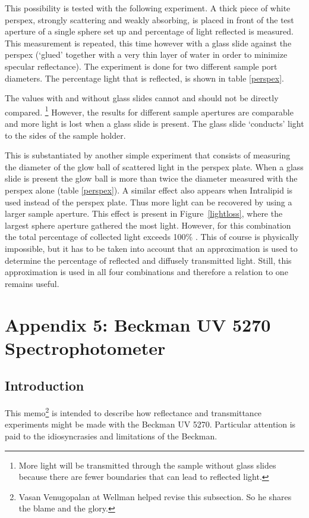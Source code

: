 \documentclass{article}
\begin{document}
This possibility is tested with the following experiment.  A thick piece of
white perspex, strongly scattering and weakly absorbing, is placed in front of
the test aperture of a single sphere set up and percentage of light reflected
is measured.  This measurement is repeated, this time however with a glass
slide against the perspex (`glued' together with a very thin layer of water in
order to minimize  specular reflectance).  The experiment is done for two
different sample port diameters.  The percentage
light that is reflected, is shown in table \ref{perspex}.

The values with and without glass slides cannot and should not be directly compared.%
\footnote{More light will be transmitted through the sample without glass
slides because there are fewer boundaries that can lead to reflected light.}
However, the results for different sample apertures are comparable and
more light is lost when a glass slide is present.  The  glass slide `conducts'
light to the sides of the sample holder.  

This is substantiated by another simple experiment that consists of measuring
the diameter of the glow ball of scattered light in the perspex plate.  When a
glass slide is present the glow ball is more than twice the diameter measured
with the perspex alone (table \ref{perspex}).  A similar effect
also appears when Intralipid is used instead of the perspex plate.  Thus more
light can be recovered by using a larger sample aperture.  This effect is
present in Figure~\ref{lightloss}, where the largest sphere aperture gathered
the most light. However, for this combination the total percentage of collected
light exceeds 100\% .  This of course is physically
impossible, but it has to be taken into account that an approximation is used
to determine the percentage of reflected and diffusely transmitted light. 
Still, this approximation is used in all four combinations and therefore a
relation to one remains useful.


\clearpage
\section*{Appendix 5: Beckman UV 5270 Spectrophotometer}

\subsection*{Introduction}
This memo\footnote{Vasan Venugopalan
at Wellman helped revise this subsection.  So he shares the blame and the glory.}
 is intended to describe how reflectance and transmittance experiments might be 
made with the Beckman UV 5270.   Particular attention is paid to the idiosyncrasies and
limitations of the Beckman.
\end{document}
